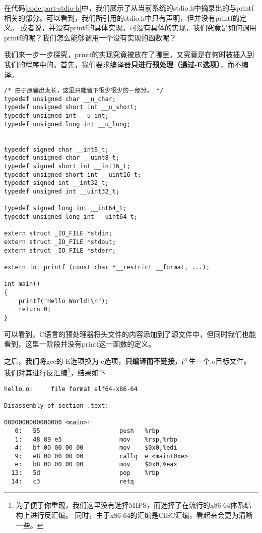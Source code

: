 在代码\ref{code:part-stdio-h}中，我们展示了从当前系统的stdio.h中摘录出的与printf相关的部分。可以看到，我们所引用的stdio.h中只有声明，但并没有printf的定义。
或者说，并没有printf的具体实现。可没有具体的实现，我们究竟是如何调用printf的呢？我们怎么能够调用一个没有实现的函数呢？

我们来一步一步探究，printf的实现究竟被放在了哪里，又究竟是在何时被插入到我们的程序中的。首先，我们要求编译器\textbf{只进行预处理（通过-E选项）}，而不编译。

\begin{verbatim}
/* 由于原输出太长，这里只能留下很少很少的一部分。 */
typedef unsigned char __u_char;
typedef unsigned short int __u_short;
typedef unsigned int __u_int;
typedef unsigned long int __u_long;


typedef signed char __int8_t;
typedef unsigned char __uint8_t;
typedef signed short int __int16_t;
typedef unsigned short int __uint16_t;
typedef signed int __int32_t;
typedef unsigned int __uint32_t;

typedef signed long int __int64_t;
typedef unsigned long int __uint64_t;

extern struct _IO_FILE *stdin;
extern struct _IO_FILE *stdout;
extern struct _IO_FILE *stderr;

extern int printf (const char *__restrict __format, ...);

int main()
{
    printf("Hello World!\n");
    return 0;
}
\end{verbatim}

可以看到，C语言的预处理器将头文件的内容添加到了源文件中，但同时我们也能看到，这里一阶段并没有printf这一函数的定义。

之后，我们将gcc的-E选项换为-c选项，\textbf{只编译而不链接}，产生一个.o目标文件。
我们对其进行反汇编\footnote{为了便于你重现，我们这里没有选择MIPS，而选择了在流行的x86-64体系结构上进行反汇编。
同时，由于x86-64的汇编是CISC汇编，看起来会更为清晰一些。}，结果如下

\begin{verbatim}
hello.o:     file format elf64-x86-64

Disassembly of section .text:

0000000000000000 <main>:
   0:   55                      push   %rbp
   1:   48 89 e5                mov    %rsp,%rbp
   4:   bf 00 00 00 00          mov    $0x0,%edi
   9:   e8 00 00 00 00          callq  e <main+0xe>
   e:   b8 00 00 00 00          mov    $0x0,%eax
  13:   5d                      pop    %rbp
  14:   c3                      retq
\end{verbatim}

